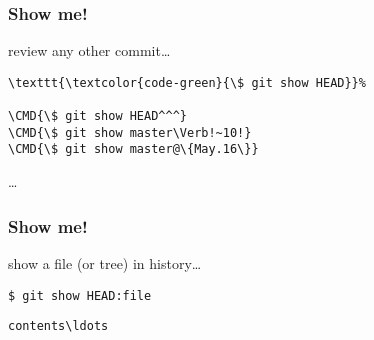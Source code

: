 \documentclass[english]{beamer}
\newcommand{\CMD}[1]{%
\texttt{\textcolor{code-green}{#1}}%
}
\begin{document}
\begin{frame}[fragile]
\frametitle{Show me!}

review any other commit\ldots
\vspace{\baselineskip}

\begin{Verbatim}[commandchars=\\\{\}]
\CMD{\$ git show HEAD}
\CMD{\$ git show HEAD^^^}
\CMD{\$ git show master\Verb!~10!}
\CMD{\$ git show master@\{May.16\}}
\end{Verbatim}

\ldots

\vspace{\textheight}
\end{frame}

\begin{frame}[fragile]
\frametitle{Show me!}

show a file (or tree) in history\ldots
\vspace{\baselineskip}

\CMD{\$ git show HEAD:file}
{\small
\begin{Verbatim}[commandchars=\\\{\}]
contents\ldots
\end{Verbatim}
}
\vspace{\textheight}
\end{frame}
\end{document}

